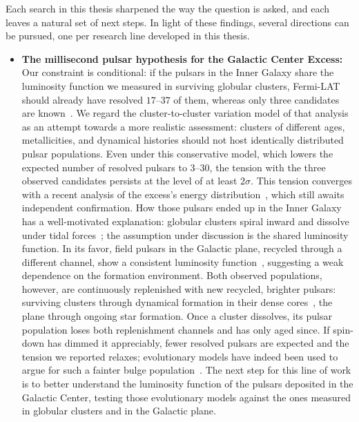 Each search in this thesis sharpened the way
the question is asked, and each leaves a natural set of next steps. In light of
these findings, several directions can be pursued, one per research line
developed in this thesis.

\begin{itemize}
    \item \textbf{The millisecond pulsar hypothesis for the Galactic Center
    Excess:} Our constraint is conditional: if the pulsars in the Inner Galaxy
    share the luminosity function we measured in surviving globular clusters,
    Fermi-LAT should already have resolved $17$--$37$ of them, whereas only
    three candidates are known~\cite{Amerio:2024qor}. We regard the
    cluster-to-cluster variation model of that analysis as an attempt towards a more realistic
    assessment: clusters of different ages, metallicities, and dynamical
    histories should not host identically distributed pulsar populations.
    Even under this conservative model, which lowers the expected number of
    resolved pulsars to $3$--$30$, the tension with the three observed
    candidates persists at the level of at least $2\sigma$. This tension converges
    with a recent analysis of the excess's energy
    distribution~\cite{List:2025qbx}, which still awaits independent
    confirmation. How those pulsars ended up in the
    Inner Galaxy has a well-motivated explanation: globular clusters spiral
    inward and dissolve under tidal
    forces~\cite{Gnedin:2013cda,Brandt:2015ula,Fragione:2017rsp}; the
    assumption under discussion is the shared luminosity function. In its favor,
    field pulsars in the Galactic plane, recycled through a different
    channel, show a consistent luminosity function~\cite{Holst:2024fvb},
    suggesting a weak dependence on the formation environment. Both observed
    populations, however, are continuously replenished with new recycled,
    brighter pulsars: surviving clusters through dynamical formation in their
    dense cores~\cite{Ye:2022yxt}, the plane through ongoing star formation.
    Once a cluster dissolves, its pulsar population loses both
    replenishment channels and has only aged since. If spin-down has dimmed it appreciably, fewer
    resolved pulsars are expected and the tension we reported relaxes; evolutionary
    models have indeed been used to argue for such a fainter bulge
    population~\cite{Fragione:2017rsp,Ploeg:2020jeh,Ye:2022yxt}. The next
    step for this line of work is to better understand the luminosity
    function of the pulsars deposited in the Galactic Center, testing those
    evolutionary models against the ones measured in globular clusters and in
    the Galactic plane.


\end{itemize}

